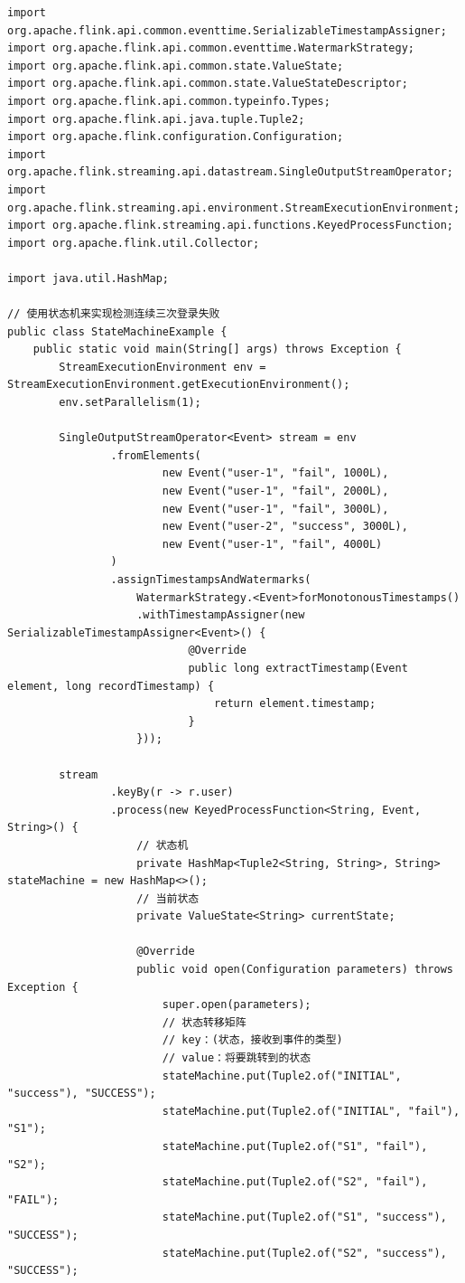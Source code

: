 \documentclass[cn,11pt,chinese]{elegantbook}
\begin{document}
\begin{verbatim}
import org.apache.flink.api.common.eventtime.SerializableTimestampAssigner;
import org.apache.flink.api.common.eventtime.WatermarkStrategy;
import org.apache.flink.api.common.state.ValueState;
import org.apache.flink.api.common.state.ValueStateDescriptor;
import org.apache.flink.api.common.typeinfo.Types;
import org.apache.flink.api.java.tuple.Tuple2;
import org.apache.flink.configuration.Configuration;
import org.apache.flink.streaming.api.datastream.SingleOutputStreamOperator;
import org.apache.flink.streaming.api.environment.StreamExecutionEnvironment;
import org.apache.flink.streaming.api.functions.KeyedProcessFunction;
import org.apache.flink.util.Collector;

import java.util.HashMap;

// 使用状态机来实现检测连续三次登录失败
public class StateMachineExample {
    public static void main(String[] args) throws Exception {
        StreamExecutionEnvironment env = StreamExecutionEnvironment.getExecutionEnvironment();
        env.setParallelism(1);

        SingleOutputStreamOperator<Event> stream = env
                .fromElements(
                        new Event("user-1", "fail", 1000L),
                        new Event("user-1", "fail", 2000L),
                        new Event("user-1", "fail", 3000L),
                        new Event("user-2", "success", 3000L),
                        new Event("user-1", "fail", 4000L)
                )
                .assignTimestampsAndWatermarks(
                    WatermarkStrategy.<Event>forMonotonousTimestamps()
                    .withTimestampAssigner(new SerializableTimestampAssigner<Event>() {
                            @Override
                            public long extractTimestamp(Event element, long recordTimestamp) {
                                return element.timestamp;
                            }
                    }));

        stream
                .keyBy(r -> r.user)
                .process(new KeyedProcessFunction<String, Event, String>() {
                    // 状态机
                    private HashMap<Tuple2<String, String>, String> stateMachine = new HashMap<>();
                    // 当前状态
                    private ValueState<String> currentState;

                    @Override
                    public void open(Configuration parameters) throws Exception {
                        super.open(parameters);
                        // 状态转移矩阵
                        // key：(状态，接收到事件的类型)
                        // value：将要跳转到的状态
                        stateMachine.put(Tuple2.of("INITIAL", "success"), "SUCCESS");
                        stateMachine.put(Tuple2.of("INITIAL", "fail"), "S1");
                        stateMachine.put(Tuple2.of("S1", "fail"), "S2");
                        stateMachine.put(Tuple2.of("S2", "fail"), "FAIL");
                        stateMachine.put(Tuple2.of("S1", "success"), "SUCCESS");
                        stateMachine.put(Tuple2.of("S2", "success"), "SUCCESS");


\end{verbatim}
\end{document}
